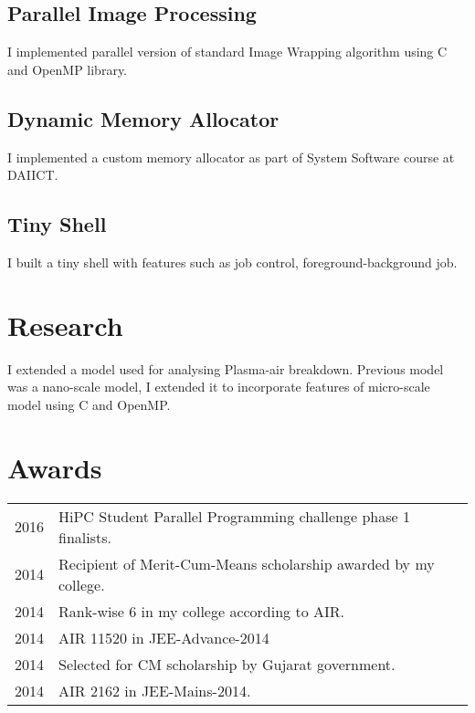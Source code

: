 \documentclass[]{deedy-resume-openfont}
\begin{document}
\begin{minipage}[t]{0.66\textwidth}
\subsection{Parallel Image Processing}
I implemented parallel version of standard Image Wrapping algorithm using C and
OpenMP library.
\sectionsep

\subsection{Dynamic Memory Allocator}
I implemented a custom memory allocator as part of System Software course at DAIICT.
\sectionsep

\subsection{Tiny Shell}
I built a tiny shell with features such as job control, foreground-background job.
\sectionsep


\section{Research}
I extended a model used for analysing Plasma-air breakdown. Previous model was a
nano-scale model, I extended it to incorporate features of micro-scale model using C
and OpenMP.
\sectionsep


\section{Awards} 
\begin{tabular}{rl}
2016        & HiPC Student Parallel Programming challenge phase 1 finalists.\\
2014        & Recipient of Merit-Cum-Means scholarship awarded by my college. \\
2014        & Rank-wise 6 in my college according to AIR.\\
2014        & AIR 11520 in JEE-Advance-2014 \\	
2014        & Selected for CM scholarship by Gujarat government. \\
2014        & AIR 2162 in JEE-Mains-2014.
\end{tabular}
\sectionsep

\end{minipage} 
\end{document}
